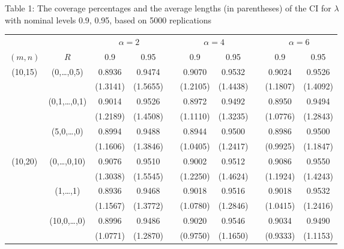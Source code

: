 \documentclass[12pt]{article}
\begin{document}
{\scriptsize
\begin{center}
{Table 1: The coverage percentages and the average lengths (in parentheses) of the CI for $\lambda$ \\with nominal levels 0.9, 0.95, based on 5000 replications}\\[5pt]
\begin{tabular}{cccccccccc}\hline
     &     &\multicolumn{2}{c}{$\alpha=2$} && \multicolumn{2}{c}{$\alpha=4$}&&\multicolumn{2}{c}{$\alpha=6$}\\\cline{3-4} \cline{6-7} \cline{9-10}
$(m,n)$ & $R$                 & 0.9     &0.95     && 0.9     &0.95     && 0.9     &0.95      \\ \hline
(10,15) & (0,\dots,0,5)       & 0.8936  &  0.9474 && 0.9070  &  0.9532 && 0.9024  &  0.9526           \\
        &                     &(1.3141) & (1.5655)&&(1.2105) & (1.4438)&&(1.1807) & (1.4092) \\
        & (0,1,\ldots,0,1)    & 0.9014  &  0.9526 && 0.8972  &  0.9492 && 0.8950  &  0.9494                  \\
        &                     &(1.2189) & (1.4508)&&(1.1110) & (1.3235)&&(1.0776) & (1.2843) \\
        & (5,0,\dots,0)       & 0.8994  &  0.9488 && 0.8944  &  0.9500 && 0.8986  &  0.9500             \\
        &                     &(1.1606) & (1.3846)&&(1.0405) & (1.2417)&&(0.9925) & (1.1847) \\



(10,20) & (0,\dots,0,10)      & 0.9076  &  0.9510 && 0.9002  &  0.9512 && 0.9086  &  0.9550              \\
        &                     &(1.3038) & (1.5545)&&(1.2250) & (1.4624)&&(1.1924) & (1.4243) \\
        & (1,\dots,1)         & 0.8936  &  0.9468 && 0.9018  &  0.9516 && 0.9018  &  0.9532                  \\
        &                     &(1.1567) & (1.3772)&&(1.0780) & (1.2846)&&(1.0415) & (1.2416) \\
        & (10,0,\dots,0)      & 0.8996  &  0.9486 && 0.9020  &  0.9546 && 0.9034  &  0.9490                  \\
        &                     &(1.0771) & (1.2870)&&(0.9750) & (1.1650)&&(0.9333) & (1.1153) \\


\end{tabular}
\end{center}}
\end{document}
